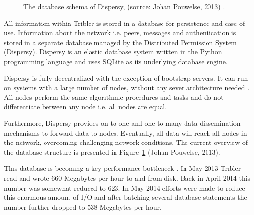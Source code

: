 \begin{figure}[!h]
	\caption{The database schema of Dispersy, (source: Johan Pouwelse, 2013) \cite{pouwelse2013documentation}.}
	\label{fig:dispersy_database_schema}
\end{figure}

All information within Tribler is stored in a database for persistence and ease of use.
Information about the network i.e. peers, messages and authentication is stored in a separate database managed by the Distributed Permission System (Dispersy).
Dispersy is an elastic database system written in the Python programming language and uses SQLite as its underlying database engine.

Dispersy is fully decentralized with the exception of bootstrap servers.
It can run on systems with a large number of nodes, without any sever architecture needed \cite{dispersy2016dispersy, zeilemaker2013dispersy}.
All nodes perform the same algorithmic procedures and tasks and do not differentiate between any node i.e. all nodes are equal.

Furthermore, Dispersy provides on-to-one and one-to-many data dissemination mechanisms to forward data to nodes.
Eventually, all data will reach all nodes in the network, overcoming challenging network conditions.
The current overview of the database structure is presented in Figure~\ref{fig:dispersy_database_schema} (Johan Pouwelse, 2013).

This database is becoming a key performance bottleneck \cite{pouwelse2014reduce}.
In May 2013 Tribler read and wrote 660 Megabytes per hour to and from disk.
Back in April 2014 this number was somewhat reduced to 623.
In May 2014 efforts were made to reduce this enormous amount of I/O and after batching several database statements the number further dropped to 538 Megabytes per hour.


